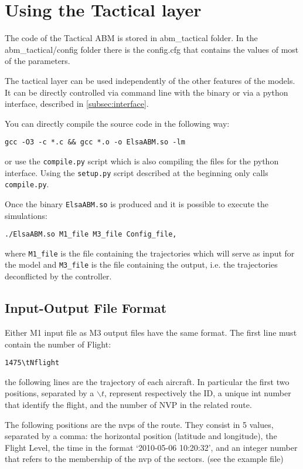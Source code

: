 \documentclass[12pt]{article}
\begin{document}
\section{Using the Tactical layer}

The code of the Tactical ABM is stored in abm\_tactical folder. In the abm\_tactical/config folder there is the config.cfg that contains the values of most of the parameters.

The tactical layer can be used independently of the other features of the models. It can be directly controlled via command line with the binary or via a python interface, described in \ref{subsec:interface}.

You can directly compile the source code in the following way:

\begin{verbatim}
gcc -O3 -c *.c && gcc *.o -o ElsaABM.so -lm
\end{verbatim}
or use the \verb|compile.py| script which is also compiling the files for the python interface. Using the \verb|setup.py| script described at the beginning only calls \verb|compile.py|.

Once the binary \verb|ElsaABM.so| is produced and it is possible to execute the simulations:

\begin{verbatim}
./ElsaABM.so M1_file M3_file Config_file,
\end{verbatim}
where \verb|M1_file| is the file containing the trajectories which will serve as input for the model and \verb|M3_file| is the file containing the output, i.e. the trajectories deconflicted by the controller.

\subsection{Input-Output File Format}

Either M1 input file as M3 output files have the same format. The first line must contain the number of Flight:

\begin{verbatim}
1475\tNflight
\end{verbatim}

the following lines are the trajectory of each aircraft. In particular the first two positions, separated by a $\backslash t$,  represent respectively the ID, a unique int number that identify the flight, and the number of NVP in the related route. 

The following positions are the nvps of the route. They consist in 5 values, separated by a comma: the horizontal position (latitude and longitude), the Flight Level, the time in the format `2010-05-06 10:20:32', and an integer number that refers to the membership of the nvp of the sectors. (see the example file)
\end{document}
